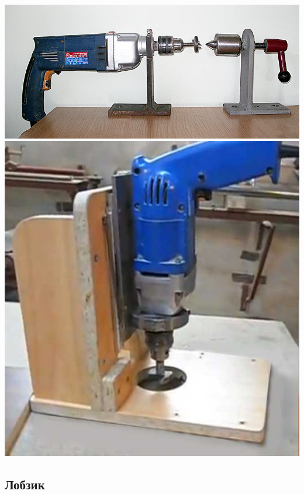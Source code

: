 \noindent\includegraphics[height=0.465\textheight]{tech/tools/DrelLathe2.jpg}
\noindent\includegraphics[height=0.465\textheight]{tech/tools/DrelBoren.jpg}
\clearpage

\subsection{Лобзик}

